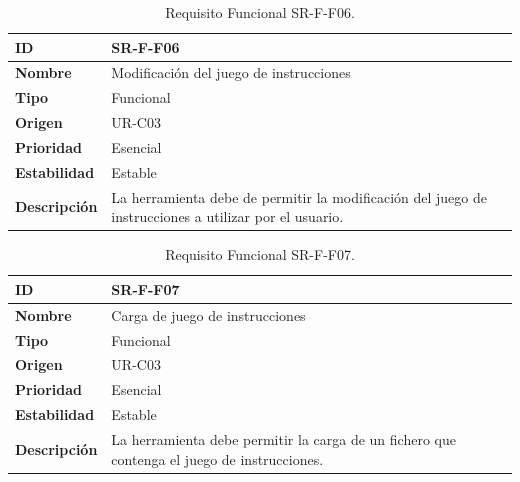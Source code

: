 \begin{center}
\begin{table}[htbp]
\centering
\begin{tabular}{@{}p{2.5cm} p{9cm}@{}} 
\toprule
\textbf{ID} 				& SR-F-F06 \\
\midrule
\textbf{Nombre} 			& Modificación del juego de instrucciones\\
\midrule
\textbf{Tipo} 			& Funcional \\
\midrule
\textbf{Origen} 			& UR-C03 \\
\midrule
\textbf{Prioridad}		& Esencial \\
\midrule
\textbf{Estabilidad} 		& Estable \\
\midrule
\textbf{Descripción} 	& La herramienta debe de permitir la modificación del juego de instrucciones a utilizar por el usuario. \\
\bottomrule
\end{tabular}
\caption{Requisito Funcional SR-F-F06.}
\label{tab:srff06}
\end{table}
\end{center}

\begin{center}
\begin{table}[htbp]
\centering
\begin{tabular}{@{}p{2.5cm} p{9cm}@{}} 
\toprule
\textbf{ID} 				& SR-F-F07 \\
\midrule
\textbf{Nombre} 			& Carga de juego de instrucciones\\
\midrule
\textbf{Tipo} 			& Funcional \\
\midrule
\textbf{Origen} 			& UR-C03 \\
\midrule
\textbf{Prioridad}		& Esencial \\
\midrule
\textbf{Estabilidad} 		& Estable \\
\midrule
\textbf{Descripción} 	& La herramienta debe permitir la carga de un fichero que contenga el juego de instrucciones. \\
\bottomrule
\end{tabular}
\caption{Requisito Funcional SR-F-F07.}
\label{tab:srff07}
\end{table}
\end{center}


